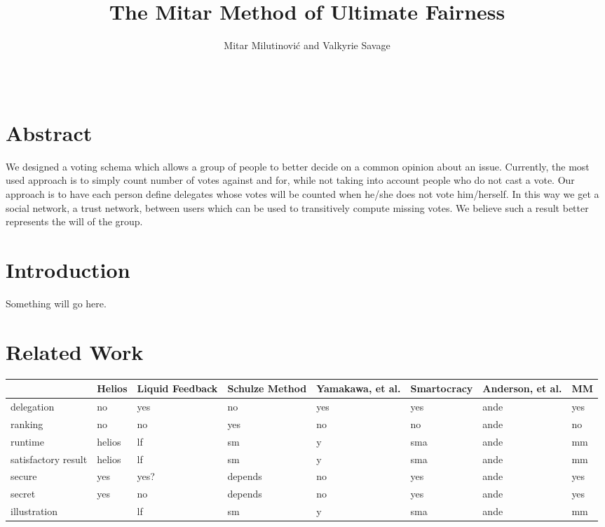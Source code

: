 \documentclass[a4paper]{acm_proc_article-sp}
\begin{document}
\title{The Mitar Method of Ultimate Fairness}
\author{\alignauthor Mitar Milutinovi\'{c} and Valkyrie Savage\\
 \\
\\
} 
\maketitle

\setcounter{page}{1}

\section{Abstract}

We designed a voting schema which allows a group of people to better decide on a common opinion about an issue. Currently,
the most used approach is to simply count number of votes against and for, while not taking into account people who do
not cast a vote. Our approach is to have each person define delegates whose votes will be counted when he/she does not
vote him/herself. In this way we get a social network, a trust network, between users which can be
used to transitively compute missing votes. We believe such a result better represents the will of the group.

\section{Introduction}

Something will go here.

\section{Related Work}

\begin{tabular}{p{1.75cm} || p{1.75cm} | p{1.75cm} | p{1.75cm} | p{1.75cm} | p{1.75cm} | p{1.75cm} | p{1.75cm}}
   & Helios & Liquid Feedback & Schulze Method & Yamakawa, et al. & Smartocracy & Anderson, et al. & MM \\
  \hline \hline
  delegation & no & yes & no & yes & yes & ande & yes \\
  \hline
  ranking & no & no & yes & no & no & ande & no \\
  \hline
  runtime & helios & lf & sm & y & sma & ande & mm \\
  \hline
  satisfactory result & helios & lf & sm & y & sma & ande & mm \\
  \hline
  secure & yes & yes? & depends & no & yes & ande & yes \\
  \hline
  secret & yes & no & depends & no & yes & ande & yes \\
  \hline
  illustration &  & lf & sm & y & sma & ande & mm \\
  \hline
\end{tabular}



\end{document}
